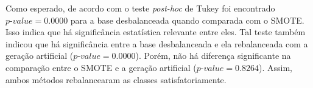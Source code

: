 

Como esperado, de acordo com o teste \textit{post-hoc} de Tukey foi encontrado $\textit{p-value} = 0.0000$ para a base desbalanceada quando comparada com o SMOTE. Isso indica que há significância estatística relevante entre eles. Tal teste também indicou que há significância entre a base desbalanceada e ela rebalanceada com a geração artificial ($\textit{p-value} = 0.0000$). Porém, não há diferença significante na comparação entre o SMOTE e a geração artificial ($\textit{p-value} = 0.8264$). Assim, ambos métodos rebalancearam as classes satisfatoriamente.

%




